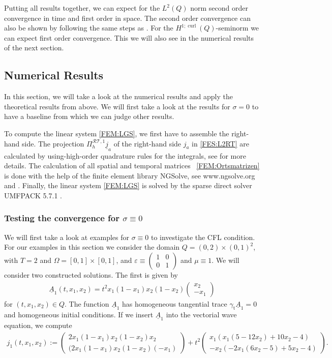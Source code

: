 \documentclass[a4paper,11pt]{article}
\newcommand{\cu}{\operatorname{curl}}
\newcommand{\trt}{\gamma_\mathrm{t}}
\renewcommand{\vec}[1]{\underline{#1}}
\begin{document}
	Putting all results together, we can expect for the $L^2(Q)$ norm second order convergence in time and first order in space. The second order convergence can also be shown by following the same steps as \cite[Thm.~2]{SteinbachZankSpring2019}. For the $H^{1;\cu}(Q)$-seminorm we can expect first order convergence. This we will also see in the numerical results of the next section.
	
\subsection{Numerical Results}\label{sec:linDep}
In this section, we will take a look at the numerical results and apply the theoretical results from above. We will first take a look at the results for $\sigma=0$ to have a baseline from which we can judge other results. 

To compute the  linear system \eqref{FEM:LGS}, we first have to assemble the right-hand side. The projection $\Pi_h^{\mathcal{RT},1} \vec j_a$ of the right-hand side $j_a$ in  \eqref{FES:L2RT} are calculated by using-high-order quadrature rules for the integrals, see \cite{HauserZank2023} for more details. The calculation of all spatial and temporal matrices ~\eqref{FEM:Ortsmatrizen} is done with the help of the finite element library NGSolve, see www.ngsolve.org and \cite{SchoeberlNetgen}. Finally, the linear system \eqref{FEM:LGS} is solved by the sparse direct solver  UMFPACK 5.7.1 \cite{Umfpack}.
\subsubsection{Testing the convergence for $\sigma \equiv 0$}
We will first take a look at examples for $\sigma  \equiv 0$ to investigate the CFL condition. For our examples in this section we consider the domain $Q = (0,2) \times (0,1)^2 $, with  $T=2$ and $\Omega=[0,1]\times[0,1]$, and $\varepsilon\equiv\begin{pmatrix}
	1&0\\0&1 \end{pmatrix}$ and $\mu \equiv 1$. We will consider two constructed solutions. The first is given by 
\begin{align}
	\label{Num:Lsg1}
	\vec A_1(t,x_1,x_2)=t^2x_1(1-x_1)x_2(1-x_2)\begin{pmatrix}x_2\\-x_1\end{pmatrix} 
\end{align}
for $(t,x_1,x_2) \in Q.$  The function $\vec A_1$ has homogeneous tangential trace $	\trt \vec A_1  =0$ and homogeneous initial conditions. If we insert $\vec A_1$ into the vectorial wave equation, we compute
\begin{align*}
	j_1(t,x_1,x_2) := \begin{pmatrix}
		2x_1(1-x_1)x_2(1-x_2)x_2 \\
		(2x_1(1-x_1)x_2(1-x_2)(-x_1)
	\end{pmatrix} + t^2\begin{pmatrix}
		x_1(x_1(5-12x_2)+10x_2-4)\\
		-x_2(-2x_1(6x_2-5)+5x_2-4)
	\end{pmatrix} .
\end{align*}
\end{document}
